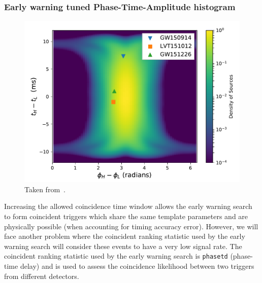 \subsubsection{\label{6:sec:ew_phasetd}Early warning tuned Phase-Time-Amplitude histogram}
\begin{figure}
    \centering
    \includegraphics[width=1.0\linewidth]{images/6_earlywarning/identified-problems/phase_time.pdf}
    \caption{Taken from~\cite{PyCBC:2017}.}
    \label{6:fig:phase-time-histogram}
\end{figure}
%
Increasing the allowed coincidence time window allows the early warning search to form coincident triggers which share the same template parameters and are physically possible (when accounting for timing accuracy error). However, we will face another problem where the coincident ranking statistic used by the early warning search will consider these events to have a very low signal rate. The coincident ranking statistic used by the early warning search is \texttt{phasetd} (phase-time delay) and is used to assess the coincidence likelihood between two triggers from different detectors.

